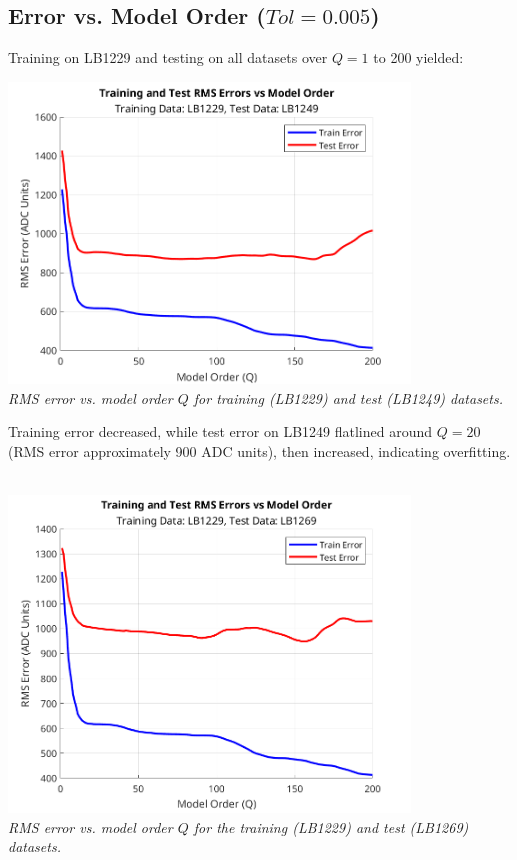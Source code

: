 \documentclass[12pt]{article}
\begin{document}
\subsection*{Error vs. Model Order ($Tol = 0.005$)}
Training on LB1229 and testing on all datasets over $Q = 1$ to 200 yielded: 
\begin{center}
     \includegraphics[width=0.8\textwidth]{plots/lab1_train_test_49.png} \\
     \textit{RMS error vs. model order $Q$ for training (LB1229) and test (LB1249) datasets.}
\end{center}
Training error decreased, while test error on LB1249 flatlined around $Q = 20$ (RMS error approximately 900 ADC units), then increased, indicating overfitting. 
\\\\

\begin{center}
     \includegraphics[width=0.8\textwidth]{plots/lab1_train_test_69.png} \\
     \textit{RMS error vs. model order $Q$ for the training (LB1229) and test (LB1269) datasets.}
\end{center}
\end{document}
